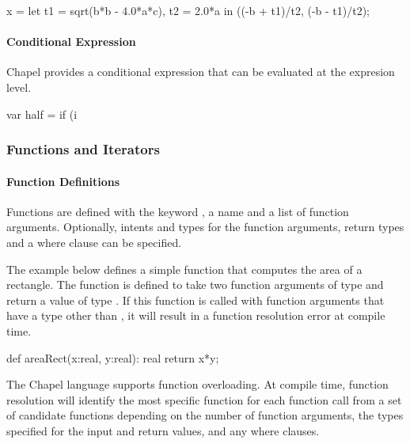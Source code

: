 \begin{example}
\begin{chapel}
x = let t1 = sqrt(b*b - 4.0*a*c), t2 = 2.0*a
    in ((-b + t1)/t2, (-b - t1)/t2);
\end{chapel}
\end{example}

\paragraph{Conditional Expression} 
Chapel provides a conditional expression that can be evaluated
at the expresion level.

\begin{example}
\begin{chapel}
var half = if (i %
\end{chapel}
\end{example}

\subsubsection{Functions and Iterators}
\paragraph{Function Definitions}
Functions are defined with the keyword , a name and a list of function
arguments.  Optionally, intents and types for the function arguments, return types and 
a where clause can be specified.  

\begin{example}
The example below defines a simple function that computes the area of a rectangle.
The  function is defined to take two function arguments of type
 and return a value of type .  If this function is called with 
function arguments that have a type other than , it will result in a function
resolution error at compile time.
\begin{chapel}
def areaRect(x:real, y:real): real {
  return x*y;
}
\end{chapel}
\end{example}

The Chapel language supports function overloading.  At compile time, function
resolution will identify the most specific function for each function call from a set
of candidate functions depending on the number of function arguments, the types 
specified for the input and return values, and any where clauses.


